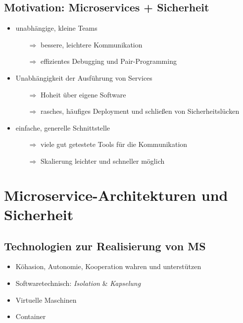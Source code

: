 \documentclass{beamer}
\begin{document}
\subsection{Motivation: Microservices + Sicherheit}
\begin{frame}{\insertsubsection}
	\begin{itemize}
		\item unabhängige, kleine Teams
		\begin{itemize}
			\item[$\Rightarrow$] bessere, leichtere Kommunikation
			\item[$\Rightarrow$] effizientes Debugging und Pair-Programming
		\end{itemize}
		\item Unabhängigkeit der Ausführung von Services
		\begin{itemize}
			\item[$\Rightarrow$] Hoheit über eigene Software
			\item[$\Rightarrow$] rasches, häufiges Deployment und schließen von Sicherheitslücken
		\end{itemize}
		\item einfache, generelle Schnittstelle
		\begin{itemize}
			\item[$\Rightarrow$] viele gut getestete Tools für die Kommunikation
			\item[$\Rightarrow$] Skalierung leichter und schneller möglich
		\end{itemize}
	\end{itemize}
\end{frame}

	
\section{Microservice-Architekturen und Sicherheit}

\subsection{Technologien zur Realisierung von MS}
\begin{frame}{\insertsubsection}
	\begin{itemize}
		\setlength\itemsep{2em}
		\item Köhasion, Autonomie, Kooperation wahren und unterstützen
		\item Softwaretechnisch: \textit{Isolation} \& \textit{Kapselung}
		\item Virtuelle Maschinen
		\item Container
	\end{itemize}
\end{frame}
\end{document}
